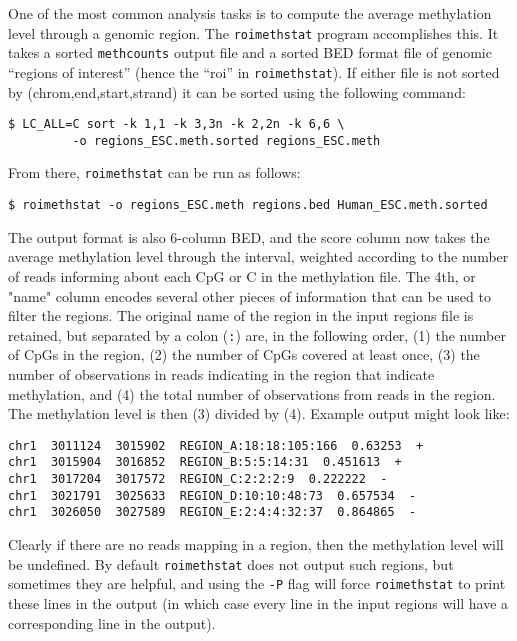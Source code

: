 \documentclass[10pt]{article}
\newcommand{\prog}[1]{\texttt{#1}}
\newcommand{\lit}[1]{\texttt{#1}}
\newcommand{\op}[1]{\texttt{#1}}
\begin{document}
One of the most common analysis tasks is to compute the average
methylation level through a genomic region. The \prog{roimethstat}
program accomplishes this. It takes a sorted \prog{methcounts} output
file and a sorted BED format file of genomic ``regions of interest''
(hence the ``roi'' in \prog{roimethstat}).  If either file is not
sorted by (chrom,end,start,strand) it can be sorted using the
following command:
\begin{verbatim}
$ LC_ALL=C sort -k 1,1 -k 3,3n -k 2,2n -k 6,6 \
         -o regions_ESC.meth.sorted regions_ESC.meth
\end{verbatim}
From there, \prog{roimethstat} can be run as follows:
\begin{verbatim}
$ roimethstat -o regions_ESC.meth regions.bed Human_ESC.meth.sorted
\end{verbatim}
The output format is also 6-column BED, and the score column now takes
the average methylation level through the interval, weighted according
to the number of reads informing about each CpG or C in the
methylation file. The 4th, or "name" column encodes several other
pieces of information that can be used to filter the regions. The
original name of the region in the input regions file is retained, but
separated by a colon (\lit{:}) are, in the following order, (1) the
number of CpGs in the region, (2) the number of CpGs covered at least
once, (3) the number of observations in reads indicating in the region
that indicate methylation, and (4) the total number of observations
from reads in the region. The methylation level is then (3) divided by
(4). Example output might look like:
\begin{verbatim}
chr1  3011124  3015902  REGION_A:18:18:105:166  0.63253  +
chr1  3015904  3016852  REGION_B:5:5:14:31  0.451613  +
chr1  3017204  3017572  REGION_C:2:2:2:9  0.222222  -
chr1  3021791  3025633  REGION_D:10:10:48:73  0.657534  -
chr1  3026050  3027589  REGION_E:2:4:4:32:37  0.864865  -
\end{verbatim}
Clearly if there are no reads mapping in a region, then the
methylation level will be undefined. By default \prog{roimethstat}
does not output such regions, but sometimes they are helpful, and
using the \op{-P} flag will force \prog{roimethstat} to print these
lines in the output (in which case every line in the input regions
will have a corresponding line in the output).

\end{document}

